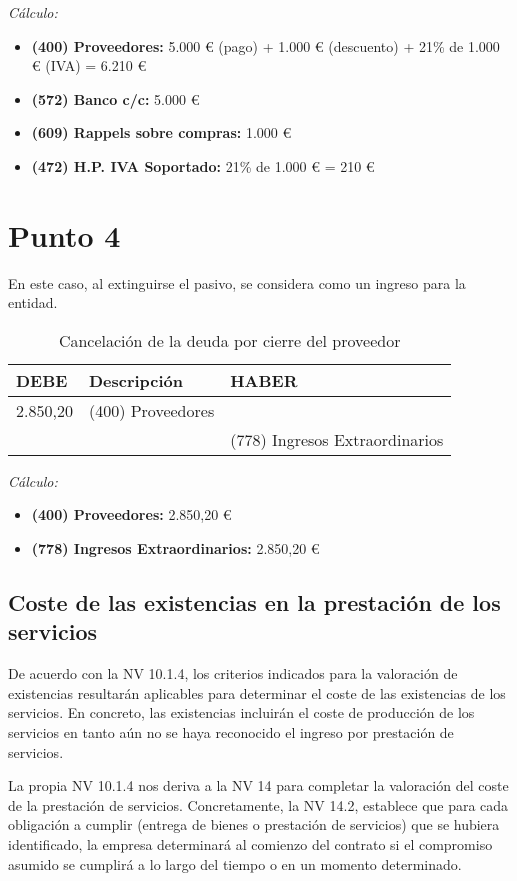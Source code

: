 \documentclass{article}
\begin{document}
\textit{Cálculo:}
\begin{itemize}
    \item \textbf{(400) Proveedores:} 5.000 € (pago) + 1.000 € (descuento) + 21\% de 1.000 € (IVA) = 6.210 €
    \item \textbf{(572) Banco c/c:} 5.000 €
    \item \textbf{(609) Rappels sobre compras:} 1.000 €
    \item \textbf{(472) H.P. IVA Soportado:} 21\% de 1.000 € = 210 €
\end{itemize}

\section*{Punto 4}

En este caso, al extinguirse el pasivo, se considera como un ingreso para la entidad.

\begin{table}[H]
\centering
\begin{tabular}{|p{4cm}|p{4cm}|p{4cm}|}
\hline
\textbf{DEBE} & \textbf{Descripción} & \textbf{HABER} \\
\hline
2.850,20 & (400) Proveedores & \\
& & (778) Ingresos Extraordinarios \\
\hline
\end{tabular}
\caption{Cancelación de la deuda por cierre del proveedor}
\end{table}

\textit{Cálculo:}
\begin{itemize}
    \item \textbf{(400) Proveedores:} 2.850,20 €
    \item \textbf{(778) Ingresos Extraordinarios:} 2.850,20 €
\end{itemize}

\subsection{Coste de las existencias en la prestación de los servicios}

De acuerdo con la NV 10.1.4, los criterios indicados para la valoración de existencias resultarán aplicables para determinar el coste de las existencias de los servicios. En concreto, las existencias incluirán el coste de producción de los servicios en tanto aún no se haya reconocido el ingreso por prestación de servicios.

La propia NV 10.1.4 nos deriva a la NV 14 para completar la valoración del coste de la prestación de servicios. Concretamente, la NV 14.2, establece que para cada obligación a cumplir (entrega de bienes o prestación de servicios) que se hubiera identificado, la empresa determinará al comienzo del contrato si el compromiso asumido se cumplirá a lo largo del tiempo o en un momento determinado.
\end{document}
